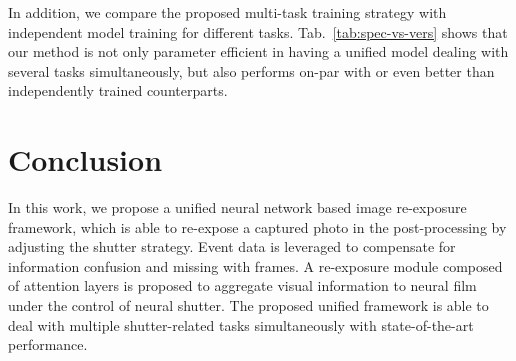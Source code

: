 \documentclass[10pt,twocolumn,letterpaper]{article}
\begin{document}
In addition, we compare the proposed multi-task training strategy with independent model training for different tasks. Tab.~\ref{tab:spec-vs-vers} shows that our method is not only parameter efficient in having a unified model dealing with several tasks simultaneously, but also performs on-par with or even better than independently trained counterparts.

\begin{table}[h!]
\centering
	\caption{Comparison of specialized and versatile NIRE (in PSNR/SSIM).}
\end{table} 



\section{Conclusion}


In this work, we propose a unified neural network based image re-exposure framework, which is able to re-expose a captured photo in the post-processing by adjusting the shutter strategy.
Event data is leveraged to compensate for information confusion and missing with frames.
A re-exposure module composed of attention layers is proposed to aggregate visual information to neural film under the control of neural shutter. 
The proposed unified framework is able to deal with multiple shutter-related tasks simultaneously with state-of-the-art performance.





{\small


}
\end{document}
